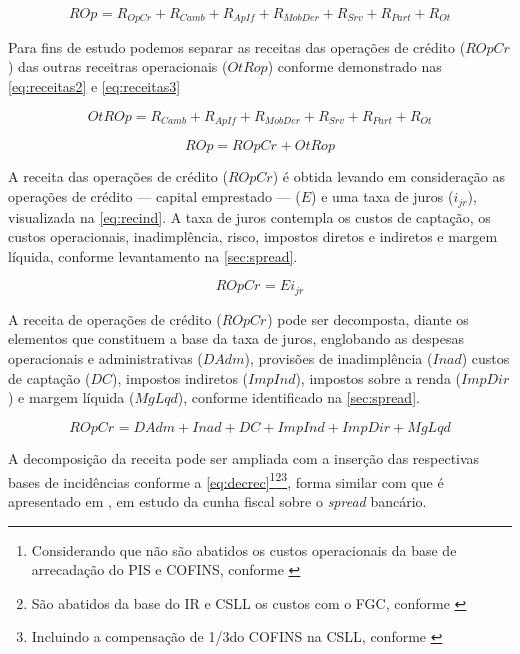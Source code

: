 \documentclass[
  12pt,
  12pt,
  openright,
  oneside,
  a4paper,
  chapter=TITLE,
  section=TITLE,
  subsection=TITLE,
  subsubsection=TITLE,
  english,
  portugues,
  sumario=tradicional]{abntex2}
\begin{document}
\begin{apendicesenv}
\begin{equation}\label{eq:receitas}
ROp_{} = R_{OpCr} + R_{Camb} + R_{ApIf} + R_{MobDer} + R_{Srv} + R_{Part} + R_{Ot}
\end{equation}


Para fins de estudo podemos separar as receitas das operações de crédito ($ROpCr_{}$) das outras receitras operacionais ($OtRop$) conforme demonstrado nas \autoref{eq:receitas2} e  \autoref{eq:receitas3} 


\begin{equation}\label{eq:receitas2}
OtROp = R_{Camb} + R_{ApIf} + R_{MobDer} + R_{Srv} + R_{Part} + R_{Ot} 
\end{equation}

\begin{equation}\label{eq:receitas3}
ROp = ROpCr_{} + OtRop
\end{equation}

A receita das operações de crédito ($ROpCr$) é obtida levando em  consideração as operações de crédito — capital emprestado — ($E$) e uma taxa de juros ($i_{jr}$), visualizada na \autoref{eq:recind}. A taxa de juros contempla os custos de captação, os custos operacionais, inadimplência, risco, impostos diretos e indiretos e margem líquida, conforme levantamento na \autoref{sec:spread}.



\begin{equation}\label{eq:recind}
ROpCr_{} = Ei_{jr}
\end{equation}



A receita de operações de crédito ($ROpCr_{}$) pode ser decomposta, diante os elementos que constituem a base da taxa de juros,  englobando as despesas operacionais e administrativas ($DAdm$), provisões de inadimplência ($Inad$) custos de captação ($DC$), impostos indiretos ($ImpInd$), impostos sobre a renda ($ImpDir$) e margem líquida ($MgLqd$), conforme identificado na \autoref{sec:spread}.



\begin{equation}
ROpCr_{} = DAdm + Inad + DC + ImpInd + ImpDir + MgLqd
\end{equation}


A decomposição da receita pode ser ampliada com a inserção das respectivas bases de incidências conforme a \autoref{eq:decrec}\footnote{Considerando que não são abatidos os custos operacionais da base de arrecadação do PIS e COFINS, conforme \textcite{cardoso:1999}}\footnote{São abatidos da base do IR e CSLL os custos com o FGC, conforme \textcite{cardoso:1999}}\footnote{Incluindo a compensação de 1/3do COFINS na CSLL, conforme \textcite{cardoso:1999}}, forma similar com que é apresentado em \textcite{cardoso:1999}, em estudo da cunha fiscal sobre o \emph{spread} bancário. 


\end{apendicesenv}
\end{document}
